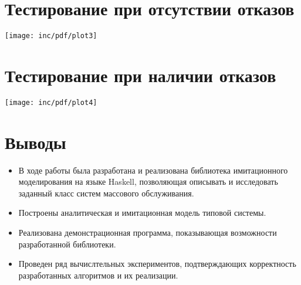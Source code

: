 \documentclass[12pt]{article}
\begin{document}





\normalsize
\section{Тестирование при отсутствии отказов}
\centering
\texttt{[image: inc/pdf/plot3]}

\section{Тестирование при наличии отказов}
\texttt{[image: inc/pdf/plot4]}



\section{Выводы}

\small

\begin{itemize}

\item В ходе работы была разработана и реализована библиотека имитационного моделирования на языке Haskell, позволяющая описывать и исследовать заданный класс систем массового обслуживания.

\item Построены аналитическая и имитационная модель типовой системы.

\item Реализована демонстрационная программа, показывающая возможности разработанной библиотеки.

\item Проведен ряд вычислтельных экспериментов, подтверждающих корректность разработанных алгоритмов и их реализации.

\end{itemize}
\normalsize
\end{document}
